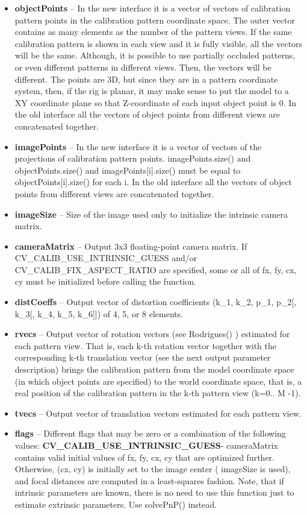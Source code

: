 \documentclass[]{article}
\begin{document}
\begin{itemize}
\item
  \textbf{objectPoints} -- In the new interface it is a vector of
  vectors of calibration pattern points in the calibration pattern
  coordinate space. The outer vector contains as many elements as the
  number of the pattern views. If the same calibration pattern is shown
  in each view and it is fully visible, all the vectors will be the
  same. Although, it is possible to use partially occluded patterns, or
  even different patterns in different views. Then, the vectors will be
  different. The points are 3D, but since they are in a pattern
  coordinate system, then, if the rig is planar, it may make sense to
  put the model to a XY coordinate plane so that Z-coordinate of each
  input object point is 0. In the old interface all the vectors of
  object points from different views are concatenated together.
\item
  \textbf{imagePoints} -- In the new interface it is a vector of vectors
  of the projections of calibration pattern points. imagePoints.size()
  and objectPoints.size() and imagePoints{[}i{]}.size() must be equal to
  objectPoints{[}i{]}.size() for each i. In the old interface all the
  vectors of object points from different views are concatenated
  together.
\item
  \textbf{imageSize} -- Size of the image used only to initialize the
  intrinsic camera matrix.
\item
  \textbf{cameraMatrix} -- Output 3x3 floating-point camera matrix. If
  CV\_CALIB\_USE\_INTRINSIC\_GUESS and/or CV\_CALIB\_FIX\_ASPECT\_RATIO
  are specified, some or all of fx, fy, cx, cy must be initialized
  before calling the function.
\item
  \textbf{distCoeffs} -- Output vector of distortion coefficients (k\_1,
  k\_2, p\_1, p\_2{[}, k\_3{[}, k\_4, k\_5, k\_6{]}{]}) of 4, 5, or 8
  elements.
\item
  \textbf{rvecs} -- Output vector of rotation vectors (see Rodrigues() )
  estimated for each pattern view. That is, each k-th rotation vector
  together with the corresponding k-th translation vector (see the next
  output parameter description) brings the calibration pattern from the
  model coordinate space (in which object points are specified) to the
  world coordinate space, that is, a real position of the calibration
  pattern in the k-th pattern view (k=0.. M -1).
\item
  \textbf{tvecs} -- Output vector of translation vectors estimated for
  each pattern view.
\item
  \textbf{flags} -- Different flags that may be zero or a combination of
  the following values: \textbf{CV\_CALIB\_USE\_INTRINSIC\_GUESS}-
  cameraMatrix contains valid initial values of fx, fy, cx, cy that are
  optimized further. Otherwise, (cx, cy) is initially set to the image
  center ( imageSize is used), and focal distances are computed in a
  least-squares fashion. Note, that if intrinsic parameters are known,
  there is no need to use this function just to estimate extrinsic
  parameters. Use solvePnP() instead.
\end{itemize}
\end{document}
